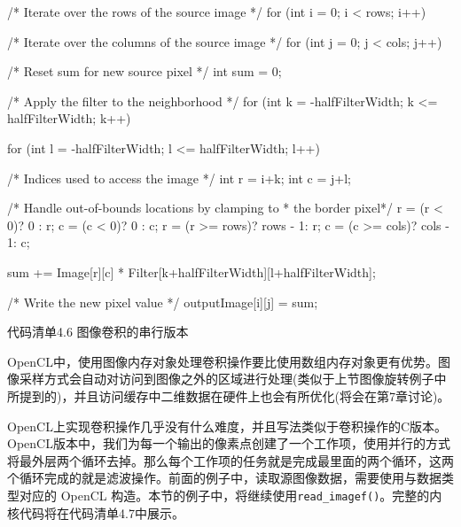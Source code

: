 \begin{codebox}[cpp]
/* Iterate over the rows of the source image */
for (int i = 0; i < rows; i++)
{
  /* Iterate over the columns of the source image */
  for (int j = 0; j < cols; j++)
  {
    /* Reset sum for new source pixel */
    int sum = 0;

    /* Apply the filter to the neighborhood */
    for (int k = -halfFilterWidth; k <= halfFilterWidth; k++)
    {
      for (int l = -halfFilterWidth; l <= halfFilterWidth; l++)
      {
        /* Indices used to access the image */
        int r = i+k;
        int c = j+l;

        /* Handle out-of-bounds locations by clamping to
         * the border pixel*/
        r = (r < 0)? 0 : r;
        c = (c < 0)? 0 : c;
        r = (r >= rows)? rows - 1: r;
        c = (c >= cols)? cols - 1: c;

        sum += Image[r][c] *
               Filter[k+halfFilterWidth][l+halfFilterWidth];
      }
    }

    /* Write the new pixel value */
    outputImage[i][j] = sum;
  }
}
\end{codebox}

代码清单4.6 图像卷积的串行版本

OpenCL中，使用图像内存对象处理卷积操作要比使用数组内存对象更有优势。图像采样方式会自动对访问到图像之外的区域进行处理(类似于上节图像旋转例子中所提到的)，并且访问缓存中二维数据在硬件上也会有所优化(将会在第7章讨论)。

OpenCL上实现卷积操作几乎没有什么难度，并且写法类似于卷积操作的C版本。OpenCL版本中，我们为每一个输出的像素点创建了一个工作项，使用并行的方式将最外层两个循环去掉。那么每个工作项的任务就是完成最里面的两个循环，这两个循环完成的就是滤波操作。前面的例子中，读取源图像数据，需要使用与数据类型对应的 OpenCL 构造。本节的例子中，将继续使用\texttt{read\_imagef()}。完整的内核代码将在代码清单4.7中展示。


